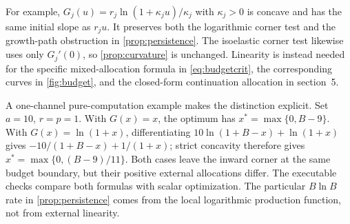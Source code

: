 For example, $G_j(u)=r_j\ln(1+\kappa_j u)/\kappa_j$ with
$\kappa_j>0$ is concave and has the same initial slope as $r_ju$.
It preserves both the logarithmic corner test and the growth-path
obstruction in \cref{prop:persistence}. The isoelastic corner test likewise
uses only $G_j'(0)$, so \cref{prop:curvature} is unchanged. Linearity is
instead needed for the specific mixed-allocation formula in
\cref{eq:budgetcrit}, the corresponding curves in \cref{fig:budget},
and the closed-form continuation allocation in section~5.

A one-channel pure-computation example makes the distinction explicit.
Set $a=10$, $r=p=1$. With $G(x)=x$, the optimum has
$x^*=\max\{0,B-9\}$. With $G(x)=\ln(1+x)$, differentiating
$10\ln(1+B-x)+\ln(1+x)$ gives
$-10/(1+B-x)+1/(1+x)$; strict concavity therefore gives
$x^*=\max\{0,(B-9)/11\}$. Both cases leave the inward corner at the
same budget boundary, but their positive external allocations differ.
The executable checks compare both formulas with scalar optimization.
The particular $B\ln B$ rate in \cref{prop:persistence} comes from the
local logarithmic production function, not from external linearity.
